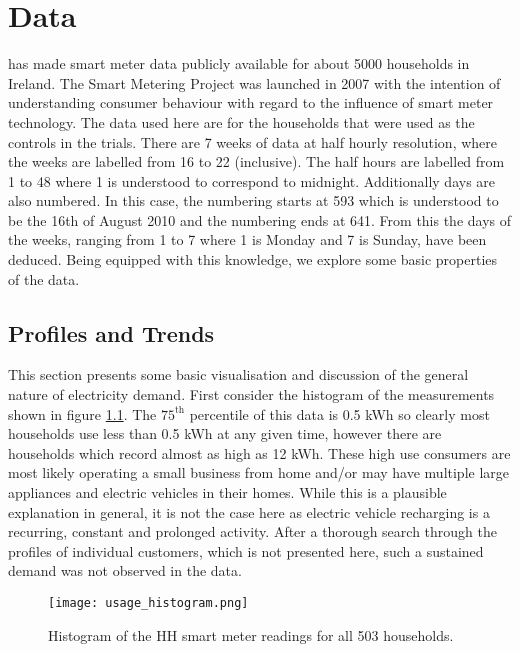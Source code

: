 
\chapter{Data} \label{sec:results}

\citet{issda} has made smart meter data publicly available for about 5000 households in Ireland. The Smart Metering Project was launched in 2007 with the intention of understanding consumer behaviour with regard to the influence of smart meter technology. The data used here are for the households that were used as the controls in the trials. There are 7 weeks of data at half hourly resolution, where the weeks are labelled from 16 to 22 (inclusive). The half hours are labelled from 1 to 48 where 1 is understood to correspond to midnight. Additionally days are also numbered. In this case, the numbering starts at 593 which is understood to be the 16th of August 2010 and the numbering ends at 641. From this the days of the weeks, ranging from 1 to 7 where 1 is Monday and 7 is Sunday, have been deduced. Being equipped with this knowledge, we explore some basic properties of the data.

\section{Profiles and Trends}
\label{subsec:basic} 
This section presents some basic visualisation and discussion of the general nature of electricity demand. First consider the histogram of the measurements shown in figure \ref{fig:hist}. The $75^{\text{th}}$ percentile of this data is 0.5 kWh so clearly most households use less than 0.5 kWh at any given time, however there are households which record almost as high as 12 kWh. These high use consumers are most likely operating a small business from home and/or may have multiple large appliances and electric vehicles in their homes. While this is a plausible explanation in general, it is not the case here as electric vehicle recharging is a recurring, constant and prolonged activity. After a thorough search through the profiles of individual customers, which is not presented here, such a sustained demand was not observed in the data.

\begin{figure}
\centering
\texttt{[image: usage\_histogram.png]}
\caption{Histogram of the HH smart meter readings for all 503 households.}
\label{fig:hist} 
\end{figure}

